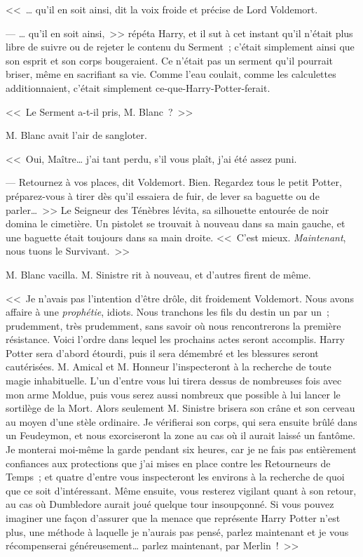 <<~… qu'il en soit ainsi, dit la voix froide et précise de Lord Voldemort.

--- … qu'il en soit ainsi,~>> répéta Harry, et il sut à cet instant qu'il n'était plus libre de suivre ou de rejeter le contenu du Serment~; c'était simplement ainsi que son esprit et son corps bougeraient. Ce n'était pas un serment qu'il pourrait briser, même en sacrifiant sa vie. Comme l'eau coulait, comme les calculettes additionnaient, c'était simplement ce-que-Harry-Potter-ferait.

<<~Le Serment a-t-il pris, M. Blanc~?~>>

M. Blanc avait l'air de sangloter.

<<~Oui, Maître… j'ai tant perdu, s'il vous plaît, j'ai été assez puni.

--- Retournez à vos places, dit Voldemort. Bien. Regardez tous le petit Potter, préparez-vous à tirer dès qu'il essaiera de fuir, de lever sa baguette ou de parler…~>> Le Seigneur des Ténèbres lévita, sa silhouette entourée de noir domina le cimetière. Un pistolet se trouvait à nouveau dans sa main gauche, et une baguette était toujours dans sa main droite. <<~C'est mieux. \emph{Maintenant}, nous tuons le Survivant.~>>

M. Blanc vacilla. M. Sinistre rit à nouveau, et d'autres firent de même.

<<~Je n'avais pas l'intention d'être drôle, dit froidement Voldemort. Nous avons affaire à une \emph{prophétie}, idiots. Nous tranchons les fils du destin un par un~; prudemment, très prudemment, sans savoir où nous rencontrerons la première résistance. Voici l'ordre dans lequel les prochains actes seront accomplis. Harry Potter sera d'abord étourdi, puis il sera démembré et les blessures seront cautérisées. M. Amical et M. Honneur l'inspecteront à la recherche de toute magie inhabituelle. L'un d'entre vous lui tirera dessus de nombreuses fois avec mon arme Moldue, puis vous serez aussi nombreux que possible à lui lancer le sortilège de la Mort. Alors seulement M. Sinistre brisera son crâne et son cerveau au moyen d'une stèle ordinaire. Je vérifierai son corps, qui sera ensuite brûlé dans un Feudeymon, et nous exorciseront la zone au cas où il aurait laissé un fantôme. Je monterai moi-même la garde pendant six heures, car je ne fais pas entièrement confiances aux protections que j'ai mises en place contre les Retourneurs de Temps~; et quatre d'entre vous inspecteront les environs à la recherche de quoi que ce soit d'intéressant. Même ensuite, vous resterez vigilant quant à son retour, au cas où Dumbledore aurait joué quelque tour insoupçonné. Si vous pouvez imaginer une façon d'assurer que la menace que représente Harry Potter n'est plus, une méthode à laquelle je n'aurais pas pensé, parlez maintenant et je vous récompenserai généreusement… parlez maintenant, par Merlin~!~>>

